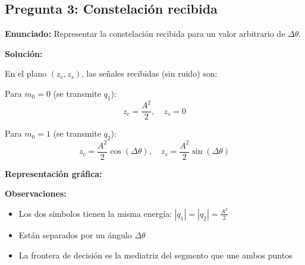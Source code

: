 \documentclass[11pt,a4paper]{article}
\begin{document}
\subsection*{Pregunta 3: Constelaci\'on recibida}

\textbf{Enunciado:} Representar la constelaci\'on recibida para un valor arbitrario de $\Delta\theta$.

\vspace{0.3cm}
\textbf{Soluci\'on:}

En el plano $(z_c, z_s)$, las se\~nales recibidas (sin ruido) son:

Para $m_0 = 0$ (se transmite $q_1$):
\[
z_c = \frac{A^2}{2}, \quad z_s = 0
\]

Para $m_0 = 1$ (se transmite $q_2$):
\[
z_c = \frac{A^2}{2}\cos(\Delta\theta), \quad z_s = \frac{A^2}{2}\sin(\Delta\theta)
\]

\textbf{Representaci\'on gr\'afica:}

\begin{center}
\end{center}

\textbf{Observaciones:}
\begin{itemize}
    \item Los dos s\'imbolos tienen la misma energ\'ia: $|q_1| = |q_2| = \frac{A^2}{2}$
    \item Est\'an separados por un \'angulo $\Delta\theta$
    \item La frontera de decisi\'on es la mediatriz del segmento que une ambos puntos
\end{itemize}
\end{document}

